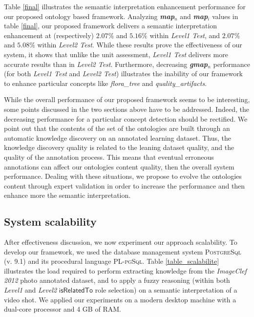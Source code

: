 		Table \ref{final} illustrates the semantic interpretation enhancement performance for our 
		proposed ontology based framework.
		Analyzing \textbf{\textit{map$_{n}$}} and \textbf{\textit{map$_{i}$}}
		values in table \ref{final}, our proposed framework delivers a semantic 
		interpretation enhancement at (respectively) $2.07\%$ and $5.16\%$ within \emph{Level1 Test},
		and $2.07\%$ and $5.08\%$ within \emph{Level2 Test}.  While these results prove the effectiveness 
		of our system, it shows that unlike the unit assessment, \emph{Level1 Test} delivers more accurate 
		results than in \emph{Level2 Test}. Furthermore, decreasing \textbf{\textit{gmap$_{n}$}} performance 
		(for both \emph{Level1 Test} and \emph{Level2 Test})
		illustrates the inability of our framework to enhance particular concepts like \emph{flora\_tree} and 
		\emph{quality\_artifacts}.

		While the overall performance of our proposed framework  seems to be interesting, some points
		discussed in the two sections above have to be addressed. Indeed, the decreasing performance for 
		a particular concept detection should be rectified. We point out that the contents of the set 
		of the ontologies are built through an automatic knowledge discovery on an annotated learning 
		dataset. Thus, the knowledge discovery quality is related to the leaning dataset quality, 
		and the quality of the annotation process. This means that eventual erroneous annotations 
		can affect our ontologies content quality, then the overall system performance. 
		Dealing with these situations, we propose to evolve 
		the ontologies content through expert validation 
		in order to increase the performance and then enhance more the semantic interpretation.
		

\subsection{System scalability}
		After effectiveness discussion, we now experiment our approach scalability.
		To develop our framework, we used the database management system
		\textsc{PostgreSql} (v. 9.1) and its procedural language
		\textsc{PL-pgSql}.
		Table {\ref{table_scalabilite}} illustrates the load required to
		perform extracting knowledge from the \emph{ImageClef 2012} photo
		annotated dataset, and to apply a fuzzy reasoning (within both \emph{Level1}
		and \emph{Level2} $\mathsf{isRelatedTo}$ role selection) on a semantic interpretation of a video
		shot. We applied our experiments on a modern desktop machine with a dual-core
		processor and 4 GB of RAM. 
		
